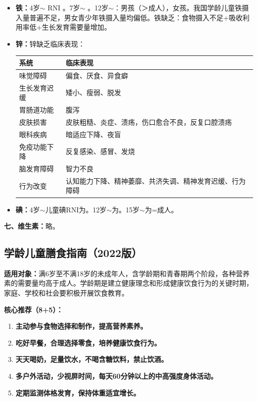 \begin{keybox}
\begin{itemize}[leftmargin=*]
    \item \textbf{铁：}4岁$\sim$ RNI 。7岁$\sim$ 。12岁$\sim$：男孩（＞成人），女孩。我国学龄儿童铁摄入量普遍不足，男女青少年铁摄入量均偏低。铁缺乏：食物摄入不足+吸收利用率低+生长发育需要量增加。

    \item \textbf{锌：}锌缺乏临床表现：
    \begin{center}
    \begin{tabular}{ll}
    \hline
    \textbf{系统} & \textbf{临床表现} \\
    \hline
    味觉障碍 & 偏食、厌食、异食癖 \\
    生长发育迟缓 & 矮小、瘦弱、脱发 \\
    胃肠道功能 & 腹泻 \\
    皮肤损害 & 皮肤粗糙、炎症、溃疡，伤口愈合不良，反复口腔溃疡 \\
    眼科疾病 & 暗适应下降、夜盲 \\
    免疫功能下降 & 反复感染、感冒、发烧 \\
    脑发育障碍 & 智力不良 \\
    行为改变 & 认知能力下降、精神萎靡、共济失调、精神发育迟缓、行为障碍 \\
    \hline
    \end{tabular}
    \end{center}

    \item \textbf{碘：}4岁$\sim$儿童碘RNI为。12岁$\sim$为。15岁$\sim$为=成人。
\end{itemize}

\textbf{七、维生素：}略。
\end{keybox}

\subsection{学龄儿童膳食指南（2022版）}

\begin{keybox}
\textbf{适用对象：}满6岁至不满18岁的未成年人，含学龄期和青春期两个阶段，各种营养素的需要量均高于成人。学龄期是建立健康理念和形成健康饮食行为的关键时期，家庭、学校和社会要积极开展饮食教育。

\textbf{核心推荐（8+5）：}
\begin{enumerate}[leftmargin=*]
    \item \textbf{主动参与食物选择和制作，提高营养素养。}
    \item \textbf{吃好早餐，合理选择零食，培养健康饮食行为。}
    \item \textbf{天天喝奶，足量饮水，不喝含糖饮料，禁止饮酒。}
    \item \textbf{多户外活动，少视屏时间，每天60分钟以上的中高强度身体活动。}
    \item \textbf{定期监测体格发育，保持体重适宜增长。}
\end{enumerate}
\end{keybox}

